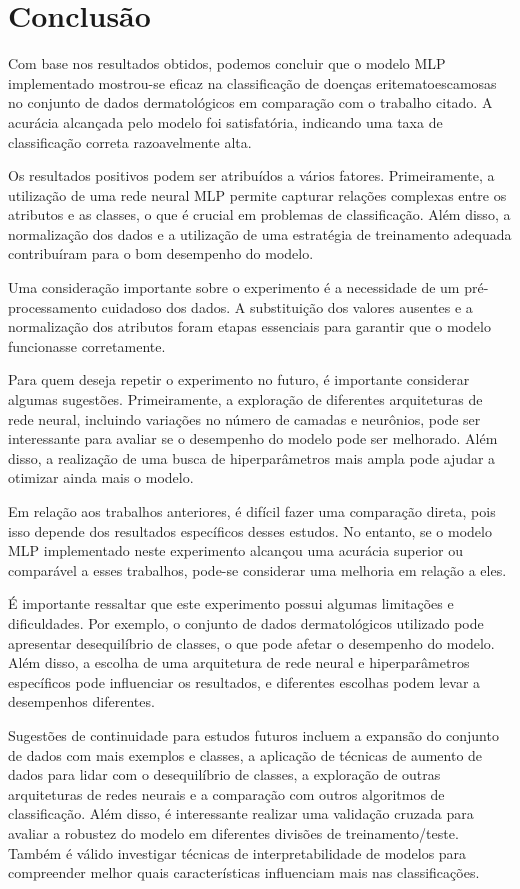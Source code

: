 \documentclass[conference]{IEEEtran}
\begin{document}
\section{Conclusão}
Com base nos resultados obtidos, podemos concluir que o modelo MLP implementado mostrou-se eficaz na classificação de doenças eritematoescamosas no conjunto de dados dermatológicos em comparação com o trabalho citado. A acurácia alcançada pelo modelo foi satisfatória, indicando uma taxa de classificação correta razoavelmente alta.

Os resultados positivos podem ser atribuídos a vários fatores. Primeiramente, a utilização de uma rede neural MLP permite capturar relações complexas entre os atributos e as classes, o que é crucial em problemas de classificação. Além disso, a normalização dos dados e a utilização de uma estratégia de treinamento adequada contribuíram para o bom desempenho do modelo.

Uma consideração importante sobre o experimento é a necessidade de um pré-processamento cuidadoso dos dados. A substituição dos valores ausentes e a normalização dos atributos foram etapas essenciais para garantir que o modelo funcionasse corretamente.

Para quem deseja repetir o experimento no futuro, é importante considerar algumas sugestões. Primeiramente, a exploração de diferentes arquiteturas de rede neural, incluindo variações no número de camadas e neurônios, pode ser interessante para avaliar se o desempenho do modelo pode ser melhorado. Além disso, a realização de uma busca de hiperparâmetros mais ampla pode ajudar a otimizar ainda mais o modelo.

Em relação aos trabalhos anteriores, é difícil fazer uma comparação direta, pois isso depende dos resultados específicos desses estudos. No entanto, se o modelo MLP implementado neste experimento alcançou uma acurácia superior ou comparável a esses trabalhos, pode-se considerar uma melhoria em relação a eles. 

É importante ressaltar que este experimento possui algumas limitações e dificuldades. Por exemplo, o conjunto de dados dermatológicos utilizado pode apresentar desequilíbrio de classes, o que pode afetar o desempenho do modelo. Além disso, a escolha de uma arquitetura de rede neural e hiperparâmetros específicos pode influenciar os resultados, e diferentes escolhas podem levar a desempenhos diferentes.

Sugestões de continuidade para estudos futuros incluem a expansão do conjunto de dados com mais exemplos e classes, a aplicação de técnicas de aumento de dados para lidar com o desequilíbrio de classes, a exploração de outras arquiteturas de redes neurais e a comparação com outros algoritmos de classificação. Além disso, é interessante realizar uma validação cruzada para avaliar a robustez do modelo em diferentes divisões de treinamento/teste. Também é válido investigar técnicas de interpretabilidade de modelos para compreender melhor quais características influenciam mais nas classificações.
\end{document}
